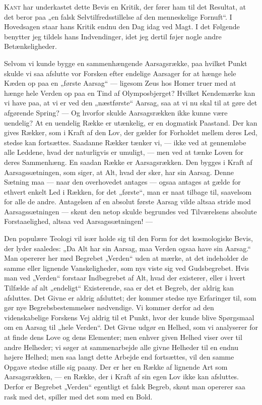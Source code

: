 \documentclass[12pt,a4paper,openany]{book}
\newcommand{\opage}[1]{\marginnote{\footnotesize\textit{[#1]}}}
\begin{document}
\textsc{Kant} har underkastet dette Bevis en Kritik, der fører ham til
det Resultat, at det beror paa „en falsk Selvtilfredsstillelse af den
menneskelige Fornuft“. I Hovedsagen staar hans Kritik endnu den Dag idag
ved Magt. I det Følgende benytter jeg tildels hans Indvendinger, idet
jeg dertil føjer nogle andre Betænkeligheder.

Selvom vi kunde bygge en sammenhængende Aarsagsrække, paa hvilket Punkt
skulde vi saa afslutte vor Forsken efter endelige Aarsager for at hænge
hele Kæden op paa en „første Aarsag“ --- ligesom Zeus hos Homer truer
med at hænge hele Verden op paa en Tind af Olymposbjerget? Hvilket
Kendemærke kan vi have paa,
\opage{23}at vi er ved den „næstførste“ Aarsag, saa at vi nu skal til at
gøre det afgørende Spring? --- Og hvorfor skulde Aarsagsrækken ikke
kunne være uendelig? At en uendelig Række er utænkelig, er en dogmatisk
Paastand. Der kan gives Rækker, som i Kraft af den Lov, der gælder for
Forholdet mellem deres Led, stedse kan fortsættes. Saadanne Rækker
tænker vi, --- ikke ved at gennemløbe alle Leddene, hvad der naturligvis
er umuligt, --- men ved at tænke Loven for deres Sammenhæng. En saadan
Række er Aarsagsrækken. Den bygges i Kraft af Aarsagssætningen, som
siger, at Alt, hvad der sker, har sin Aarsag. Denne Sætning maa --- naar
den overhovedet antages --- ogsaa antages at gælde for ethvert enkelt
Led i Rækken, for det „første“, man er naat tilbage til, saavelsom for
alle de andre. Antagelsen af en absolut første Aarsag vilde altsaa
stride mod Aarsagssætningen --- skønt den netop skulde begrundes ved
Tilværelsens absolute Forstaaelighed, altsaa ved Aarsagssætningen! ---

Den populære Teologi vil især holde sig til den Form for det
kosmologiske Bevis, der lyder saaledes: „Da Alt har sin Aarsag, maa
Verden ogsaa have sin Aarsag.“ Man opererer her med Begrebet „Verden“
uden at mærke, at det indeholder de samme eller lignende Vanskeligheder,
som nys viste sig ved Gudsbegrebet. Hvis man ved „Verden“ forstaar
Indbegrebet af Alt, hvad der existerer, eller i hvert Tilfælde af alt
„endeligt“ Existerende, saa er det et Begreb, der aldrig kan afsluttes.
Det Givne er aldrig afsluttet; der kommer stedse nye Erfaringer til, som
gør nye Begrebsbestemmelser nødvendige. Vi kommer derfor ad den
videnskabelige Forskens Vej aldrig til et Punkt, hvor der kunde blive
Spørgsmaal om en Aarsag til „hele Verden“. Det Givne udgør en Helhed,
som vi analyserer for at finde dens Love og dens Elementer; men enhver
given Helhed viser over til andre Helheder; vi søger at sammenarbejde
alle givne Helheder til en endnu højere Helhed; men saa langt dette
Arbejde end fortsættes, vil den samme Opgave stedse stille sig paany.
Der er her en Række af lignende Art som Aarsagsrækken, --- en Række, der
i Kraft af sin egen Lov ikke kan afsluttes. Derfor er Begrebet „Verden“
egentligt et falsk Begreb, skønt man opererer saa rask med det, spiller
med det som med en Bold.
\end{document}
